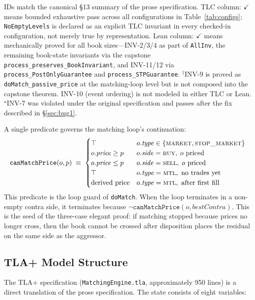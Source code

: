 \documentclass[11pt,a4paper]{article}
\begin{document}
\begin{table}[H]
\medskip
\raggedright\footnotesize
IDs match the canonical \S13 summary of the prose specification.
TLC column: $\checkmark$ means bounded exhaustive pass across all
configurations in Table~\ref{tab:configs}; \texttt{NoEmptyLevels} is
declared as an explicit TLC invariant in every checked-in
configuration, not merely true by representation. Lean column:
$\checkmark$ means mechanically proved for all book sizes---INV-2/3/4
as part of \texttt{AllInv}, the remaining book-state invariants via the
capstone \texttt{process\_preserves\_BookInvariant}, and INV-11/12 via
\texttt{process\_PostOnlyGuarantee} and \texttt{process\_STPGuarantee}.
$^{\dagger}$INV-9 is proved as \texttt{doMatch\_passive\_price} at the
matching-loop level but is not composed into the capstone theorem.
INV-10 (event ordering) is not modeled in either TLC or Lean.
$^{\star}$INV-7 was violated under the original specification and
passes after the fix described in \S\ref{sec:bug1}.
\end{table}

A single predicate governs the matching loop's continuation:
\[
\texttt{canMatchPrice}(o, p) \;\equiv\;
\begin{cases}
\top & o.\mathit{type}\in\{\textsc{market},\textsc{stop\_market}\} \\
o.\mathit{price} \geq p & o.\mathit{side}=\textsc{buy},\; o\text{ priced} \\
o.\mathit{price} \leq p & o.\mathit{side}=\textsc{sell},\; o\text{ priced} \\
\top & o.\mathit{type}=\textsc{mtl},\text{ no trades yet} \\
\text{derived price} & o.\mathit{type}=\textsc{mtl},\text{ after first fill}
\end{cases}
\]
This predicate is the loop guard of \texttt{doMatch}. When the loop
terminates in a non-empty contra side, it terminates because
$\neg\texttt{canMatchPrice}(o, \mathit{bestContra})$. This is the seed
of the three-case elegant proof: if matching stopped because prices no
longer cross, then the book cannot be crossed after disposition places
the residual on the same side as the aggressor.

\subsection{TLA+ Model Structure}
\label{sec:model}

The TLA+ specification (\texttt{MatchingEngine.tla}, approximately 950
lines) is a direct translation of the prose specification. The state
consists of eight variables:
\end{document}
